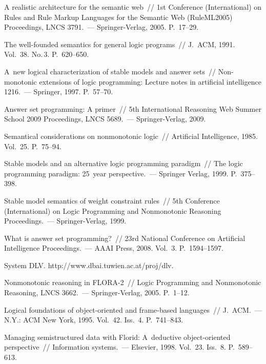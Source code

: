 \begin{multicols}{2}
{{\begin{thebibliography}{99}
A realistic architecture for the semantic web~//  1st Conference (International) on Rules and Rule Markup 
Languages for the Semantic Web (RuleML2005) Proceedings, LNCS 3791.~--- Springer-Verlag, 2005. P.~17--29.

The well-founded semantics for general logic programs~// J.~ACM, 1991. Vol.~38. No.\,3. P.~620--650.

A~new logical characterization of stable models and answer sets~// Non-monotonic extensions of logic 
programming: Lecture notes in artificial intelligence 1216.~--- Springer, 1997. P.~57--70.

Answer set programming: A primer~// 5th International Reasoning Web Summer School 2009 Proceedings, 
LNCS 5689.~--- Springer-Verlag, 2009.

Semantical considerations on nonmonotonic logic~// Artificial Intelligence, 1985. Vol.~25. P.~75--94.

 Stable models and an alternative logic programming paradigm~// The logic 
programming paradigm: 25~year perspective.~--- Springer Verlag, 1999. P.~375--398.

Stable model semantics of weight constraint rules~//  
5th Conference (International) on Logic Programming and 
Nonmonotonic Reasoning Proceedings.~--- Springer-Verlag, 1999.

What is answer set programming?~// 23rd National Conference on Artificial Intelligence Proceedings.~--- AAAI 
Press, 2008. Vol.~3. P.~1594--1597.

System DLV. {\sf http://www.dbai.tuwien.ac.at/proj/dlv}.

 Nonmonotonic reasoning in FLORA-2~// Logic Programming and Nonmonotonic Reasoning, 
LNCS 3662.~--- Springer-Verlag, 2005. P.~1--12.

Logical foundations of object-oriented and frame-based languages~// J.~ACM.~--- N.Y.: ACM New York, 
1995. Vol.~42. Iss.~4. P.~741--843.

Managing semistructured data with Florid: A~deductive object-oriented perspective~// 
Information systems.~--- 
Elsevier, 1998. Vol.~23. Iss.~8. P.~589--613.


\end{thebibliography}}}
\end{multicols}
